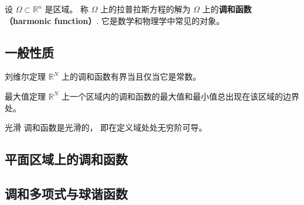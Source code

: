 
\begin{issues}
\issueDraft
\end{issues}


设 $\Omega\subset\mathbb{R}^n$ 是区域。 称 $\Omega$ 上的拉普拉斯方程的解为 $\Omega$ 上的\textbf{调和函数 （harmonic function）}. 它是数学和物理学中常见的对象。


\subsection{一般性质}
\begin{theorem}{刘维尔定理}\label{HarFun_the1}
$\mathbb R^N$ 上的调和函数有界当且仅当它是常数。
\end{theorem}

\begin{theorem}{最大值定理}
$\mathbb R^N$ 上一个区域内的调和函数的最大值和最小值总出现在该区域的边界处。
\end{theorem}

\begin{theorem}{光滑}
调和函数是光滑的， 即在定义域处处无穷阶可导。
\end{theorem}



\subsection{平面区域上的调和函数}


\subsection{调和多项式与球谐函数}
